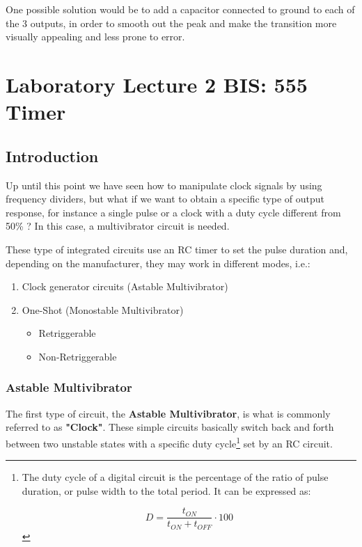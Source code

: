 \documentclass[a4paper, 11pt, oneside]{article}
\begin{document}
One possible solution would be to add a capacitor connected to ground to each of the 3 outputs, in order to smooth out the peak and make the transition more visually appealing and less prone to error.

\clearpage

\section{Laboratory Lecture 2 BIS: 555 Timer}

\subsection{Introduction}

Up until this point we have seen how to manipulate clock signals by using frequency dividers, but what if we want to obtain a specific type of output response, for instance a single pulse or a clock with a duty cycle different from 50\% ? In this case, a multivibrator circuit is needed. \medskip

These type of integrated circuits use an RC timer to set the pulse duration and, depending on the manufacturer, they may work in different modes, i.e.:

\begin{enumerate}
    \item Clock generator circuits (Astable Multivibrator)
    
    \item One-Shot (Monostable Multivibrator)
    \begin{itemize}
        \item Retriggerable
        \item Non-Retriggerable
    \end{itemize}
\end{enumerate}

\subsubsection{Astable Multivibrator}

The first type of circuit, the \textbf{Astable Multivibrator}, is what is commonly referred to as \textbf{"Clock"}. These simple circuits basically switch back and forth between two unstable states with a specific duty cycle\footnote{The duty cycle of a digital circuit is the percentage of the ratio of pulse duration, or pulse width to the total period. It can be expressed as: 

\begin{equation*}
    D = \frac{t_{ON}}{t_{ON} + t_{OFF}} \cdot 100
    \label{fig:DUTY}
\end{equation*}
} set by an RC circuit. \medskip
\end{document}
